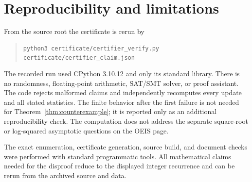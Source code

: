 \documentclass[10pt]{amsart}
\begin{document}
\section{Reproducibility and limitations}
From the source root the certificate is rerun by
\begin{quote}\small
\texttt{python3 certificate/certifier\_verify.py}\\
\texttt{\phantom{python3 }certificate/certifier\_claim.json}
\end{quote}
The recorded run used CPython 3.10.12 and only its standard library. There is
no randomness, floating-point arithmetic, SAT/SMT solver, or proof assistant.
The code rejects malformed claims and independently recomputes every update
and all stated statistics. The finite behavior after the first
failure is not needed for Theorem~\ref{thm:counterexample}; it is reported only
as an additional reproducibility check. The computation does not address the
separate square-root or log-squared asymptotic questions on the OEIS page.

The exact enumeration, certificate generation, source build, and document
checks were performed with standard programmatic tools. All mathematical
claims needed for the disproof reduce to the displayed integer recurrence and
can be rerun from the archived source and data.

\begingroup\sloppy

\endgroup
\end{document}

